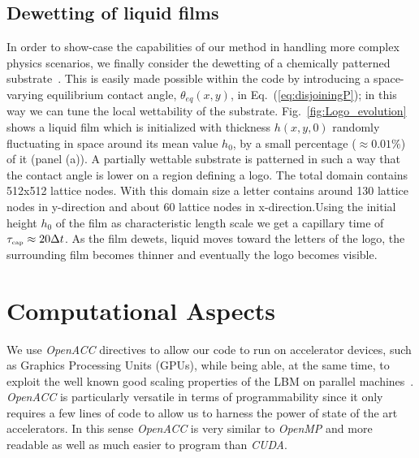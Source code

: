 \subsection{Dewetting of liquid films}
In order to show-case the capabilities of our method in handling more complex physics scenarios, we finally consider the dewetting of a chemically patterned substrate~\cite{Kargupta,Brasjen}. 
This is easily made possible within the code by introducing a space-varying equilibrium contact angle, $\theta_{eq}(x,y)$, in Eq.~(\ref{eq:disjoiningP}); in this way we can tune the local wettability of the substrate. 
Fig.~\ref{fig:Logo_evolution} shows a liquid film which is initialized with thickness $h(x,y,0)$ randomly fluctuating in space around its mean value $h_0$, by a small percentage ($\approx 0.01\%$)  of it (panel (a)). A partially wettable substrate is patterned in such a way that the contact angle is lower on a region defining a logo. The total domain contains 512x512 lattice nodes. With this domain size a letter contains around 130 lattice nodes in y-direction and about 60 lattice nodes in x-direction.Using the initial height $h_0$ of the film as characteristic length scale we get a capillary time of $\tau_{\mbox{\tiny{cap}}} \approx 20\Delta t$. As the film dewets, liquid moves toward the letters of the logo, the surrounding film becomes thinner and eventually the logo becomes visible.

\section{Computational Aspects}
We use \textit{OpenACC} directives to allow our code to run on accelerator devices, such as 
Graphics Processing Units (GPUs), while being able, at the same time, to exploit the well known good scaling properties of the LBM on parallel machines~\cite{Chandrasekaran:2017:OPC:3175812}. 
\textit{OpenACC} is particularly versatile in terms of programmability since it only requires a few lines of code to allow us to harness the power of state of the art accelerators. In this sense \textit{OpenACC} is very similar to \textit{OpenMP} and more readable as well as much easier to program than \textit{CUDA}.

